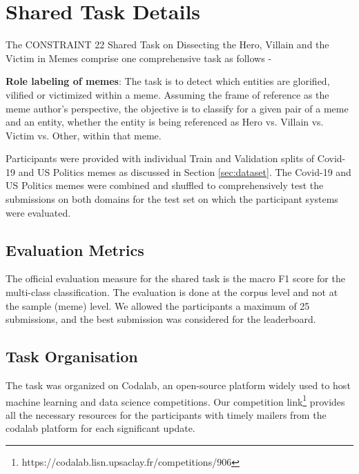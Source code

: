 \documentclass[11pt]{article}
\begin{document}
\section{Shared Task Details}
The CONSTRAINT 22 Shared Task on Dissecting the Hero, Villain and the Victim in Memes comprise one comprehensive task as follows - \par
\textbf{Role labeling of memes}: The task is to detect which entities are glorified, vilified or victimized within a meme. Assuming the frame of reference as the meme author's perspective, the objective is to classify for a given pair of a meme and an entity, whether the entity is being referenced as Hero vs. Villain vs. Victim vs. Other, within that meme.\par

Participants were provided with individual Train and Validation splits of Covid-19 and US Politics memes as discussed in Section \ref{sec:dataset}. The Covid-19 and US Politics memes were combined and shuffled to comprehensively test the submissions on both domains for the test set on which the participant systems were evaluated. 

\subsection{Evaluation Metrics}
The official evaluation measure for the shared task is the macro F1 score for the multi-class classification. The evaluation is done at the corpus level and not at the sample (meme) level. We allowed the participants a maximum of 25 submissions, and the best submission was considered for the leaderboard.  

\subsection{Task Organisation}
The task was organized on Codalab, an open-source platform widely used to host machine learning and data science competitions. Our competition link\footnote{https://codalab.lisn.upsaclay.fr/competitions/906} provides all the necessary resources for the participants with timely mailers from the codalab platform for each significant update.


\end{document}

